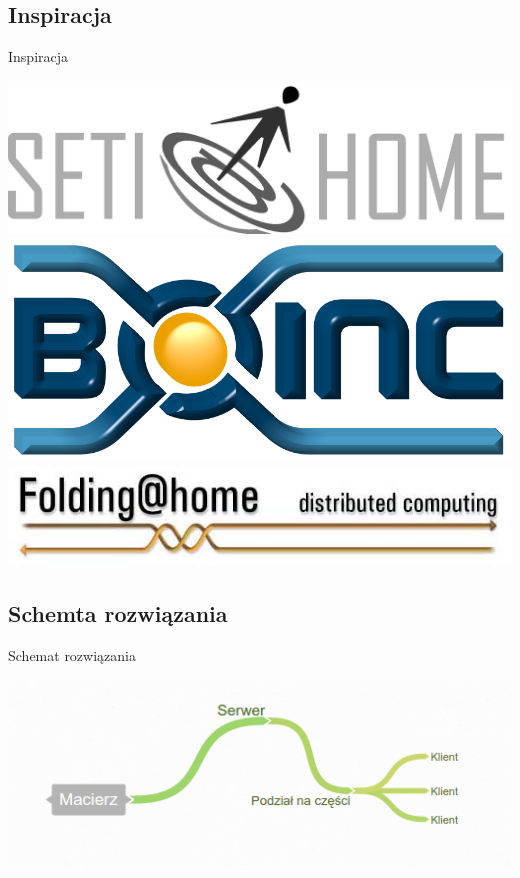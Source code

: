\documentclass[12pt]{beamer}
\begin{document}
\subsection{Inspiracja}
\begin{frame}{Inspiracja}
\begin{center}
\includegraphics[scale=0.30]{sah_logo}\\ \vspace{25pt}
\includegraphics[scale=0.20]{boinc_logo} \\ \vspace{25pt}
\includegraphics[scale=0.40]{folding_logo}
\end{center}
\end{frame}

\subsection{Schemta rozwiązania}
\begin{frame}{Schemat rozwiązania}
\begin{center}
\includegraphics[scale=0.60]{schemta}\\ \vspace{25pt}
\end{center}
\end{frame}
\end{document}
